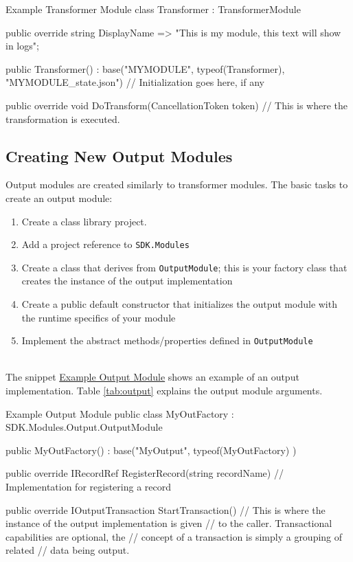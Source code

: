 \begin{code}{Example Transformer Module}{\label{lst:xform}}{}
class Transformer : TransformerModule
{
    public override string DisplayName 
        => "This is my module, this text will show in logs";

    
    public Transformer() 
        : base("MYMODULE", typeof(Transformer), "MYMODULE_state.json")
    {
        // Initialization goes here, if any
    }

    public override void DoTransform(CancellationToken token)
    {
        // This is where the transformation is executed.
    }
}
\end{code}

\subsection{Creating New Output Modules}

Output modules are created similarly to transformer modules.  The basic tasks to create an output module:

\begin{enumerate}
    \item Create a class library project.
    \item Add a project reference to \texttt{SDK.Modules}
    \item Create a class that derives from \texttt{OutputModule}; this is your factory class that creates the instance of the output implementation
    \item Create a public default constructor that initializes the output module with the runtime specifics of your module
    \item Implement the abstract methods/properties defined in \texttt{OutputModule}
\end{enumerate}

\noindent\\The snippet \hyperref[lst:output]{Example Output Module} shows an example of an output implementation.  Table \ref{tab:output} explains the output
module arguments.


\begin{code}{Example Output Module}{\label{lst:output}}{}
public class MyOutFactory : SDK.Modules.Output.OutputModule
{
    public MyOutFactory() : base("MyOutput", typeof(MyOutFactory) )
    {
    }

    public override IRecordRef RegisterRecord(string recordName)
    {
        // Implementation for registering a record
    }

    public override IOutputTransaction StartTransaction()
    {
        // This is where the instance of the output implementation is given
        // to the caller.  Transactional capabilities are optional, the
        // concept of a transaction is simply a grouping of related
        // data being output.
    }
}    
\end{code}


